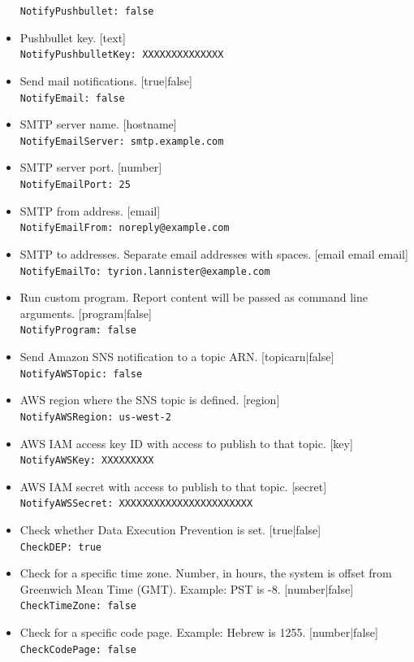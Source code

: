 \documentclass[11pt]{article}
\begin{document}
\begin{itemize}
\texttt{NotifyPushbullet: false}
\item Pushbullet key. [text]\\
\texttt{NotifyPushbulletKey: XXXXXXXXXXXXXX}
\item Send mail notifications. [true|false]\\
\texttt{NotifyEmail: false}
\item SMTP server name. [hostname]\\
\texttt{NotifyEmailServer: smtp.example.com}
\item SMTP server port. [number]\\
\texttt{NotifyEmailPort: 25}
\item SMTP from address. [email]\\
\texttt{NotifyEmailFrom: noreply@example.com}
\item SMTP to addresses. Separate email addresses with spaces. [email email email]\\
\texttt{NotifyEmailTo: tyrion.lannister@example.com}
\item Run custom program. Report content will be passed as command line arguments. [program|false]\\
\texttt{NotifyProgram: false}
\item Send Amazon SNS notification to a topic ARN. [topicarn|false]\\
\texttt{NotifyAWSTopic: false}
\item AWS region where the SNS topic is defined. [region]\\
\texttt{NotifyAWSRegion: us-west-2}
\item AWS IAM access key ID with access to publish to that topic. [key]\\
\texttt{NotifyAWSKey: XXXXXXXXX}
\item AWS IAM secret with access to publish to that topic. [secret]\\
\texttt{NotifyAWSSecret: XXXXXXXXXXXXXXXXXXXXXXX}
\item Check whether Data Execution Prevention is set. [true|false]\\
\texttt{CheckDEP: true}
\item Check for a specific time zone. Number, in hours, the system is offset from Greenwich Mean Time (GMT). Example: PST is -8. [number|false]\\
\texttt{CheckTimeZone: false}
\item Check for a specific code page. Example: Hebrew is 1255. [number|false]\\
\texttt{CheckCodePage: false}

\end{itemize}
\end{document}
